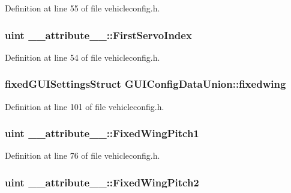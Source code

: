 Definition at line 55 of file vehicleconfig.\-h.

\hypertarget{group___config_plugin_ga7db78067a379a075d4ead422019337d3}{
\subsubsection[{First\-Servo\-Index}]{\setlength{\rightskip}{0pt plus 5cm}uint \-\_\-\-\_\-attribute\-\_\-\-\_\-\-::\-First\-Servo\-Index}}\label{group___config_plugin_ga7db78067a379a075d4ead422019337d3}


Definition at line 54 of file vehicleconfig.\-h.

\hypertarget{group___config_plugin_ga10cc00a6af97a84e5f17358ed3c5eb34}{
\subsubsection[{fixedwing}]{\setlength{\rightskip}{0pt plus 5cm}fixed\-G\-U\-I\-Settings\-Struct G\-U\-I\-Config\-Data\-Union\-::fixedwing}}\label{group___config_plugin_ga10cc00a6af97a84e5f17358ed3c5eb34}


Definition at line 101 of file vehicleconfig.\-h.

\hypertarget{group___config_plugin_ga13162fedce809405cef3920e6e81a8bc}{
\subsubsection[{Fixed\-Wing\-Pitch1}]{\setlength{\rightskip}{0pt plus 5cm}uint \-\_\-\-\_\-attribute\-\_\-\-\_\-\-::\-Fixed\-Wing\-Pitch1}}\label{group___config_plugin_ga13162fedce809405cef3920e6e81a8bc}


Definition at line 76 of file vehicleconfig.\-h.

\hypertarget{group___config_plugin_gaeef8404a3e1d41f57ce18b8e9b351a2d}{
\subsubsection[{Fixed\-Wing\-Pitch2}]{\setlength{\rightskip}{0pt plus 5cm}uint \-\_\-\-\_\-attribute\-\_\-\-\_\-\-::\-Fixed\-Wing\-Pitch2}}\label{group___config_plugin_gaeef8404a3e1d41f57ce18b8e9b351a2d}


